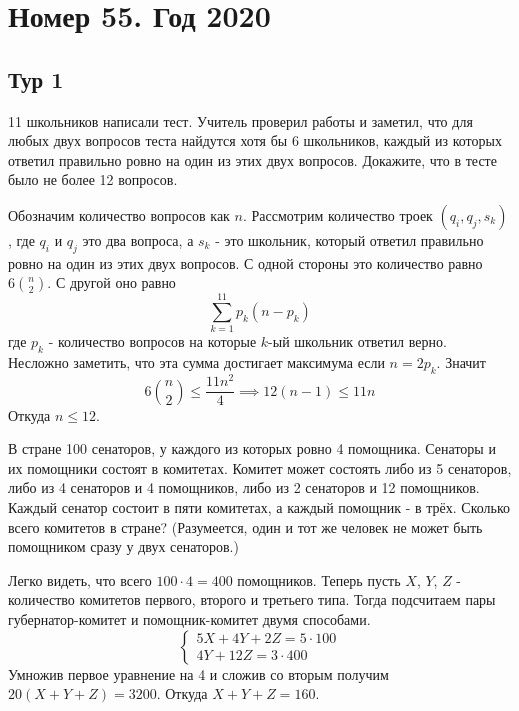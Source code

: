 \documentclass[11pt, a4paper]{common/document_template}
\begin{document}
\chapter{Номер 55. Год 2020}

\section{Тур 1}

\begin{exercise}
11 школьников написали тест. Учитель проверил работы и заметил, что для любых двух вопросов теста найдутся хотя бы 6 школьников, каждый из которых ответил правильно ровно на один из этих двух вопросов. Докажите, что в тесте было не более 12 вопросов.
\end{exercise}

\begin{Solution}
Обозначим количество вопросов как $n$. Рассмотрим количество троек $(q_{i}, q_{j}, s_{k})$, где $q_{i}$ и $q_{j}$ это два вопроса, а $s_{k}$ - это школьник, который ответил правильно ровно на один из этих двух вопросов. С одной стороны это количество равно $6 \binom{n}{2}$. С другой оно равно
$$
\sum_{k = 1}^{11} p_{k} (n - p_{k})
$$
где $p_{k}$ - количество вопросов на которые $k$-ый школьник ответил верно. Несложно заметить, что эта сумма достигает максимума если $n = 2p_{k}$. Значит
$$
6\binom{n}{2} \leqslant \frac{11 n^{2}}{4} \implies 12(n - 1) \leqslant 11n 
$$
Откуда $n \leqslant 12$.
\end{Solution}

\begin{exercise}
В стране 100 сенаторов, у каждого из которых ровно 4 помощника. Сенаторы и их помощники состоят в комитетах. Комитет может состоять либо из 5 сенаторов, либо из 4 сенаторов и 4 помощников, либо из 2 сенаторов
и 12 помощников. Каждый сенатор состоит в пяти комитетах, а каждый помощник - в трёх. Сколько всего комитетов в стране? (Разумеется, один
и тот же человек не может быть помощником сразу у двух сенаторов.)
\end{exercise}

\begin{Solution}
Легко видеть, что всего $100 \cdot 4 = 400$ помощников. Теперь пусть $X$, $Y$, $Z$ - количество комитетов первого, второго и третьего типа. Тогда подсчитаем пары губернатор-комитет и помощник-комитет двумя способами.
$$
\begin{cases}
5X + 4Y + 2Z = 5 \cdot 100 \\
4Y + 12Z = 3 \cdot 400
\end{cases}
$$
Умножив первое уравнение на 4 и сложив со вторым получим $20(X + Y + Z) = 3200$. Откуда $X + Y + Z = 160$.
\end{Solution}
\end{document}
